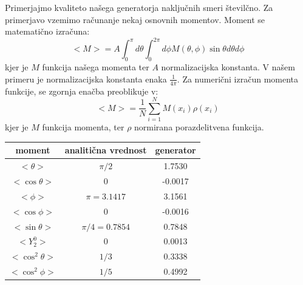 \documentclass[slovene,11pt,a4paper]{article}
\numberwithin{equation}{section} %
\numberwithin{figure}{section} %
\numberwithin{table}{section} %
\begin{document}
Primerjajmo kvaliteto našega generatorja naključnih smeri številčno. Za primerjavo vzemimo računanje nekaj osnovnih momentov. Moment se matematično izračuna:
\begin{equation}
<M>=A\int_0^{\pi} d \theta \int_0^{2 \pi} d \phi M(\theta, \phi) \sin \theta d\theta d \phi 
\end{equation}
kjer je $M$ funkcija našega momenta ter $A$ normalizacijska konstanta. V našem primeru je normalizacijska konstanta enaka $\frac{1}{4 \pi}$. Za numerični izračun momenta funkcije, se zgornja enačba preoblikuje v:
\begin{equation}
<M>=\frac{1}{N} \sum_{i=1}^N M(x_i)\rho(x_i)
\end{equation}
kjer je $M$ funkcija momenta, ter $\rho$ normirana porazdelitvena funkcija. 

\begin{table}[h]
\begin{center}
\begin{tabular}{|c|c|c|}
\hline
moment & analitična vrednost & generator \\ \hline
$<\theta>$ & $\pi /2$ & 1.7530 \\ \hline
$<\cos\theta>$ & $0$ & -0.0017 \\ \hline
$<\phi>$ & $\pi=3.1417$ & 3.1561 \\ \hline
$<\cos \phi>$ & $0$ & -0.0016 \\ \hline
$<\sin \theta>$ & $\pi/4=0.7854$ & 0.7848 \\ \hline
$<Y_2^0>$ & $0$ & 0.0013 \\ \hline
$<\cos^2 \theta>$ & $1/3$ & 0.3338 \\ \hline
$<\cos^2 \phi>$ & $1/5$ & 0.4992 \\ \hline
\end{tabular}
\label{}
\end{center}
\end{table}


\pagebreak
\end{document}
